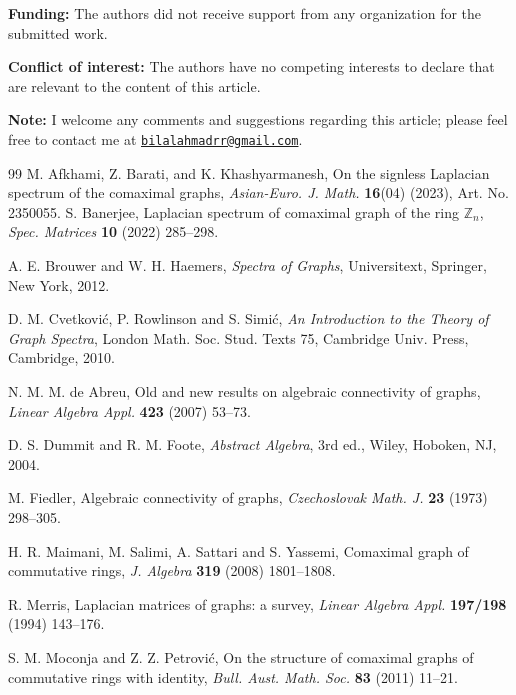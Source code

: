 \documentclass[12pt]{article}
\theoremstyle{definition}
\begin{document}
	\noindent \textbf{Funding:} The authors did not receive support from any organization for the submitted work.
	
	\noindent \textbf{Conflict of interest:} The authors have no competing interests to declare that are relevant to the content of this article.
	
	\noindent\textbf{Note:} 
	I welcome any comments and suggestions regarding this article; please feel free to contact
	me at \texttt{\href{mailto:bilalahmadrr@gmail.com}{bilalahmadrr@gmail.com}}.
	
	\begin{thebibliography}{99}
		 M. Afkhami,  Z. Barati, and K. Khashyarmanesh, On the signless Laplacian spectrum of the comaximal graphs,  \textit{Asian-Euro. J. Math.} \textbf{16}(04) (2023), Art. No. 2350055.
		S. Banerjee, Laplacian spectrum of comaximal graph of the ring $\mathbb Z_n$, \emph{Spec. Matrices} \textbf{10} (2022) 285--298.
		
		A. E. Brouwer and W. H. Haemers, \emph{Spectra of Graphs}, Universitext, Springer, New York, 2012.
		
		
		D. M. Cvetković, P. Rowlinson and S. Simić, \emph{An Introduction to the Theory of Graph Spectra}, London Math. Soc. Stud. Texts 75, Cambridge Univ. Press, Cambridge, 2010.
		
		N. M. M. de Abreu, Old and new results on algebraic connectivity of graphs, \emph{Linear Algebra Appl.} \textbf{423} (2007) 53--73.
		
		
		
		D. S. Dummit and R. M. Foote, \emph{Abstract Algebra}, 3rd ed., Wiley, Hoboken, NJ, 2004.
		
		M. Fiedler, Algebraic connectivity of graphs, \emph{Czechoslovak Math. J.} \textbf{23} (1973) 298--305.
		
		
		
		H. R. Maimani, M. Salimi, A. Sattari and S. Yassemi, Comaximal graph of commutative rings, \emph{J. Algebra} \textbf{319} (2008) 1801--1808.
		
		R. Merris, Laplacian matrices of graphs: a survey, \emph{Linear Algebra Appl.} \textbf{197/198} (1994) 143--176.
		
		S. M. Moconja and Z. Z. Petrović, On the structure of comaximal graphs of commutative rings with identity, \emph{Bull. Aust. Math. Soc.} \textbf{83} (2011) 11--21.
		

\end{thebibliography}
\end{document}
